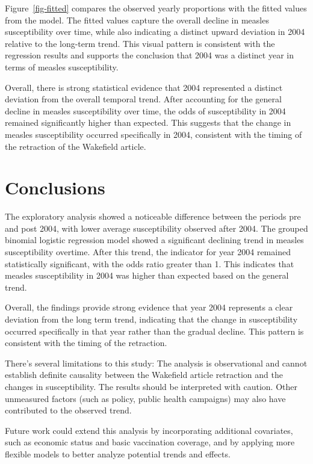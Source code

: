 \documentclass[
  letterpaper,
  DIV=11,
  numbers=noendperiod]{scrartcl}
\begin{document}
Figure~\ref{fig-fitted} compares the observed yearly proportions with
the fitted values from the model. The fitted values capture the overall
decline in measles susceptibility over time, while also indicating a
distinct upward deviation in 2004 relative to the long-term trend. This
visual pattern is consistent with the regression results and supports
the conclusion that 2004 was a distinct year in terms of measles
susceptibility.

Overall, there is strong statistical evidence that 2004 represented a
distinct deviation from the overall temporal trend. After accounting for
the general decline in measles susceptibility over time, the odds of
susceptibility in 2004 remained significantly higher than expected. This
suggests that the change in measles susceptibility occurred specifically
in 2004, consistent with the timing of the retraction of the Wakefield
article.

\section{Conclusions}\label{conclusions}

The exploratory analysis showed a noticeable difference between the
periods pre and post 2004, with lower average susceptibility observed
after 2004. The grouped binomial logistic regression model showed a
significant declining trend in measles susceptibility overtime. After
this trend, the indicator for year 2004 remained statistically
significant, with the odds ratio greater than 1. This indicates that
measles susceptibility in 2004 was higher than expected based on the
general trend.

Overall, the findings provide strong evidence that year 2004 represents
a clear deviation from the long term trend, indicating that the change
in susceptibility occurred specifically in that year rather than the
gradual decline. This pattern is consistent with the timing of the
retraction.

There's several limitations to this study: The analysis is observational
and cannot establish definite causality between the Wakefield article
retraction and the changes in susceptibility. The results should be
interpreted with caution. Other unmeasured factors (such as policy,
public health campaigns) may also have contributed to the observed
trend.

Future work could extend this analysis by incorporating additional
covariates, such as economic status and basic vaccination coverage, and
by applying more flexible models to better analyze potential trends and
effects.
\end{document}
